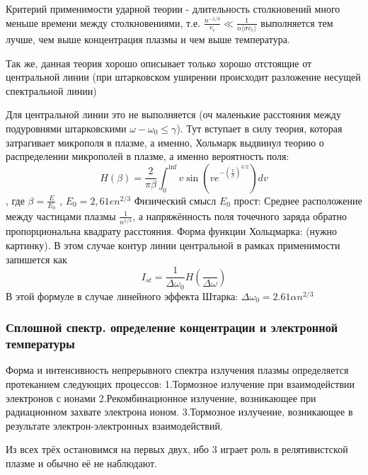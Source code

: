 \documentclass[10pt, a4paper]{article}
\begin{document}
Критерий применимости ударной теории - длительность столкновений много меньше времени между столкновениями, т.е. $\frac{n^{-1/3}}{v_e} \ll \frac{1}{n \langle\sigma v_e\rangle} $ выполняется тем лучше, чем выше концентрация плазмы и чем выше температура.

Так же, данная теория хорошо описывает только хорошо отстоящие от центральной линии (при штарковском уширении происходит разложение несущей спектральной линии)

Для центральной линии это не выполняется (оч маленькие расстояния между подуровнями штарковскими $\omega - \omega_0 \leq \gamma$).
Тут вступает в силу теория, которая затрагивает микрополя в плазме, а именно, Хольмарк выдвинул теорию о распределении микрополей в плазме, а именно вероятность поля:
\begin{equation}
	H( \beta ) = \frac{2}{\pi \beta} \int_{0}^{\inf} v \sin(v e^{- (\frac{v}{\beta})^{3/2}}) dv
\end{equation}
, где $\beta = \frac{E}{E_0}$ , $E_0 = 2,61 e n^{2/3}$ 
Физический смысл $E_0$ прост: Среднее расположение между частицами плазмы $\frac{1}{n^{1/3}} $, а напряжённость поля точечного заряда обратно пропорциональна квадрату расстояния. Форма функции Хольцмарка:
(нужно картинку).
В этом случае контур линии центральной в рамках применимости запишется как 
\begin{equation}
	I_{st}=\frac{1}{\Delta \omega_0} H(\frac{}{\Delta \omega})
\end{equation}
В этой формуле в случае линейного эффекта Штарка: $\Delta \omega_0 = 2.61 \alpha n^{2/3}$

\subsubsection{Сплошной спектр. определение концентрации и электронной температуры}

Форма и интенсивность непрерывного спектра излучения плазмы определяется протеканием следующих процессов:
1.Тормозное излучение при взаимодействии электронов с ионами
2.Рекомбинационное излучение, возникающее при радиационном захвате электрона ионом.
3.Тормозное излучение, возникающее в результате электрон-электронных взаимодействий.

Из всех трёх остановимся на первых двух, ибо 3 играет роль в релятивистской плазме и обычно её не наблюдают.
\end{document}
